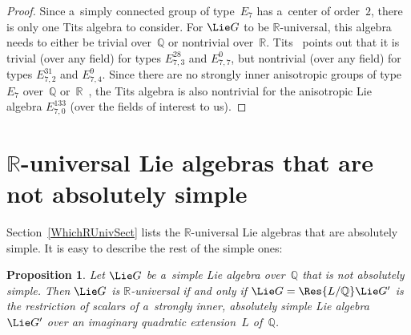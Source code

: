 \documentclass[pdftex]{sigma}
\numberwithin{equation}{section}
\newtheorem{prop}{Proposition}[section]
\begin{document}
\begin{proof}
Since a~simply connected group of type~$E_7$ has a~center of order~$2$, there is only one Tits algebra to consider.
For $\Lie G$ to be $\mathbb{R}$-universal, this algebra needs to either be trivial over~$\mathbb{Q}$ or nontrivial
over~$\mathbb{R}$.
Tits~\cite[\S~6.5.5]{Tits-RepLinIrred} points out that it is trivial (over any f\/ield) for types $E^{28}_{7,3}$ and
$E^0_{7,7}$, but nontrivial (over any f\/ield) for types $E^{31}_{7,2}$ and $E^9_{7,4}$.
Since there are no strongly inner anisotropic groups of type~$E_7$ over~$\mathbb{Q}$ or~$\mathbb{R}$~\cite[Propositions~4
and~5]{Tits-StronglyInner}, the Tits algebra is also nontrivial for the anisotropic Lie algebra $E^{133}_{7,0}$ (over
the f\/ields of interest to us).
\end{proof}

\section[$\mathbb{R}$-universal Lie algebras that are not absolutely simple]{$\boldsymbol{\mathbb{R}}$-universal Lie algebras that are not absolutely simple}\label{NotAbsSect}

Section~\ref{WhichRUnivSect} lists the $\mathbb{R}$-universal Lie algebras that are absolutely simple.
It is easy to describe the rest of the simple ones:

\begin{prop}
Let $\Lie G$ be a~simple Lie algebra over~$\mathbb{Q}$ that is not absolutely simple.
Then $\Lie G$ is $\mathbb{R}$-universal if and only if $\Lie G = \Res{L/\mathbb{Q}} \Lie G'$ is the restriction of
scalars of a~strongly inner, absolutely simple Lie algebra~$\Lie G'$ over an imaginary quadratic extension~$L$
of~$\mathbb{Q}$.
\end{prop}
\end{document}

